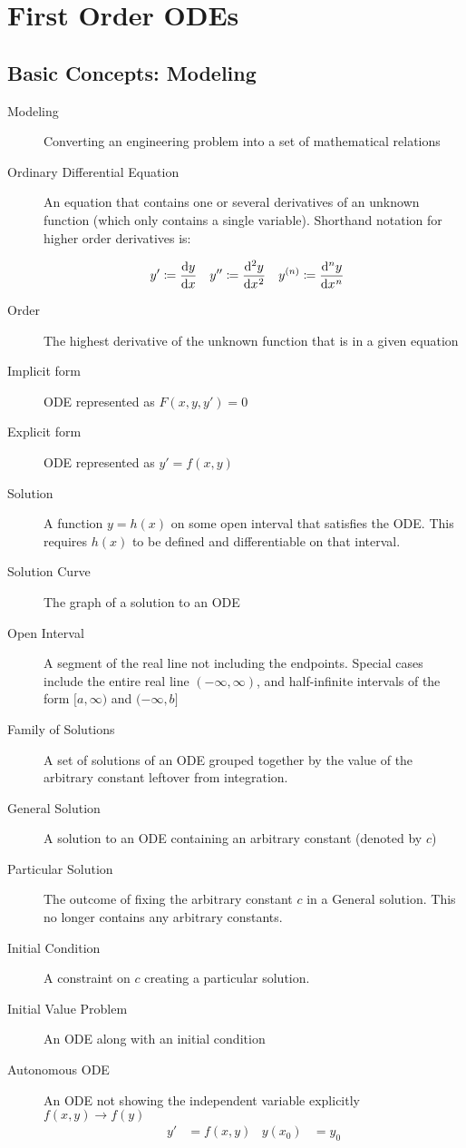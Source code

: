 \chapter{First Order ODEs}
\section{Basic Concepts: Modeling}

\begin{description}
    \item[Modeling] Converting an engineering problem into a set of mathematical relations
    \item[Ordinary Differential Equation] An equation that contains one or several derivatives of an unknown function (which only contains a single variable). Shorthand notation for higher order derivatives is:

        \begin{align}
            y'      & \coloneq \diff yx    &
            y''     & \coloneq \diff[2] yx &
            y^{(n)} & \coloneq \difoverride{n} \diff[n] yx
        \end{align}

    \item[Order] The highest derivative of the unknown function that is in a given equation
    \item[Implicit form] ODE represented as $F(x, y, y') = 0$
    \item[Explicit form] ODE represented as $y' = f(x, y)$
    \item[Solution] A function $y = h(x)$ on some open interval that satisfies the ODE. This requires $h(x)$ to be defined and differentiable on that interval.
    \item[Solution Curve] The graph of a solution to an ODE
    \item[Open Interval] A segment of the real line not including the endpoints. Special cases include the entire real line $(-\infty,\infty)$, and half-infinite intervals of the form $[a, \infty)$ and $(-\infty, b]$
    \item[Family of Solutions] A set of solutions of an ODE grouped together by the value of the arbitrary constant leftover from integration.
    \item[General Solution] A solution to an ODE containing an arbitrary constant (denoted by $c$)
    \item[Particular Solution] The outcome of fixing the arbitrary constant $c$ in a General solution. This no longer contains any arbitrary constants.
    \item[Initial Condition] A constraint on $c$ creating a particular solution.
    \item[Initial Value Problem] An ODE along with an initial condition
    \item[Autonomous ODE] An ODE not showing the independent variable explicitly $f(x, y) \rightarrow f(y)$
        \begin{align}
            y'       & = f(x, y) &
            y(x_{0}) & = y_{0}
        \end{align}
\end{description}



